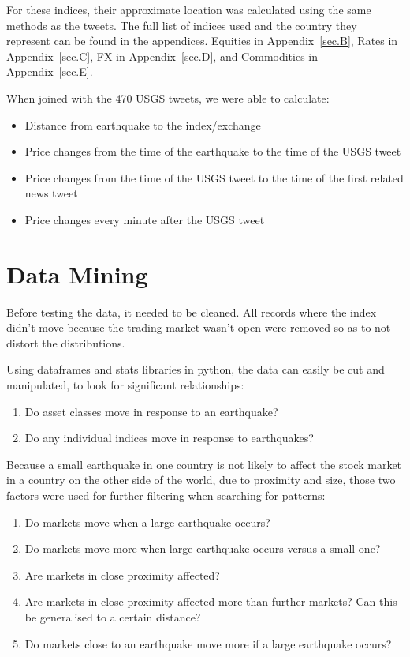 For these indices, their approximate location was calculated using the same methods as the tweets. The full list of indices used and the country they represent can be found in the appendices. Equities in Appendix~\ref{sec.B}, Rates in Appendix~\ref{sec.C}, FX in Appendix~\ref{sec.D}, and Commodities in Appendix~\ref{sec.E}.

When joined with the 470 USGS tweets, we were able to calculate:

\begin{itemize}
    \item Distance from earthquake to the index/exchange
    \item Price changes from the time of the earthquake to the time of the USGS tweet
    \item Price changes from the time of the USGS tweet to the time of the first related news tweet
    \item Price changes every minute after the USGS tweet
\end{itemize}

\pagebreak
\section{Data Mining}

Before testing the data, it needed to be cleaned. All records where the index didn't move because the trading market wasn't open were removed so as to not distort the distributions.

Using dataframes and stats libraries in python, the data can easily be cut and manipulated, to look for significant relationships:

\begin{enumerate}
    \item Do asset classes move in response to an earthquake?
    \item Do any individual indices move in response to earthquakes?
\end{enumerate}

Because a small earthquake in one country is not likely to affect the stock market in a country on the other side of the world, due to proximity and size, those two factors were used for further filtering when searching for patterns:

\begin{enumerate}
    \item Do markets move when a large earthquake occurs?
    \item Do markets move more when large earthquake occurs versus a small one?
    \item Are markets in close proximity affected?
    \item Are markets in close proximity affected more than further markets? Can this be generalised to a certain distance?
    \item Do markets close to an earthquake move more if a large earthquake occurs?
\end{enumerate}

